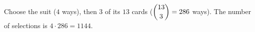 Choose the suit ($4$ ways), then $3$ of its $13$ cards ($\dbinom{13}{3}=286$ ways). The number of selections is $4\cdot286=\boxed{1144}$.
